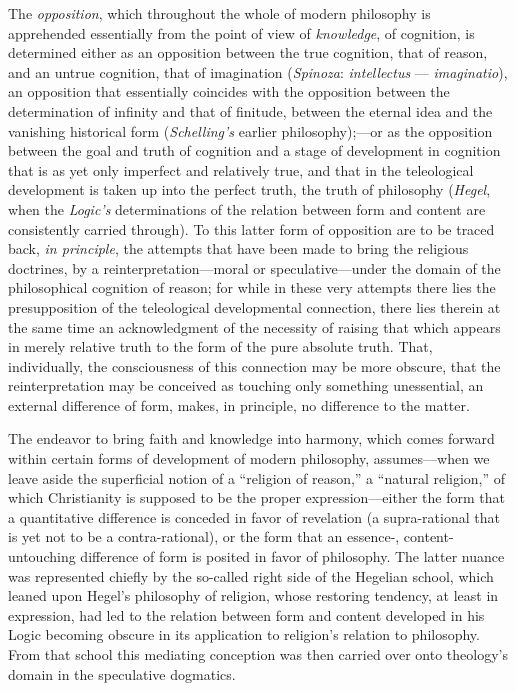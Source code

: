 \documentclass[12pt,a4paper]{book}
\begin{document}
The \emph{opposition}, which throughout the whole of modern philosophy is
apprehended essentially from the point of view of \emph{knowledge}, of cognition, is
determined either as an opposition between the true cognition, that of reason,
and an untrue cognition, that of imagination (\emph{Spinoza}: \textit{intellectus}
--- \textit{imaginatio}), an opposition that essentially coincides with the
opposition between the determination of infinity and that of finitude, between
the eternal idea and the vanishing historical form (\emph{Schelling's} earlier
philosophy);---or as the opposition between the goal and truth of cognition
and a stage of development in cognition that is as yet only imperfect and
relatively true, and that in the teleological development is taken up into the
perfect truth, the truth of philosophy (\emph{Hegel}, when the \emph{Logic's} determinations
of the relation between form and content are consistently carried through). To
this latter form of opposition are to be traced back, \emph{in principle}, the
attempts that have been made to bring the religious doctrines, by a
reinterpretation---moral or speculative---under the domain of the
philosophical cognition of reason; for while in these very attempts there lies
the presupposition of the teleological developmental connection, there lies
therein at the same time an acknowledgment of the necessity of raising that
which appears in merely relative truth to the form of the pure absolute truth.
That, individually, the consciousness of this connection may be more obscure,
that the reinterpretation may be conceived as touching only something
unessential, an external difference of form, makes, in principle, no
difference to the matter.

The endeavor to bring faith and knowledge into harmony, which comes forward
within certain forms of development of modern philosophy, assumes---when we
leave aside the superficial notion of a ``religion of reason,'' a ``natural
religion,'' of which Christianity is supposed to be the proper
expression---either the form that a quantitative difference is conceded in
favor of revelation (a supra-rational that is yet not to be a
contra-rational), or the form that an essence-, content-untouching difference
of form is posited in favor of philosophy. The latter nuance was represented
chiefly by the so-called right side of the Hegelian school, which leaned upon
Hegel's philosophy of religion, whose restoring tendency, at least in
expression, had led to the relation between form and content developed in his
Logic becoming obscure in its application to religion's relation to
philosophy. From that school this mediating conception was then carried over
onto theology's domain in the speculative dogmatics.
\end{document}
